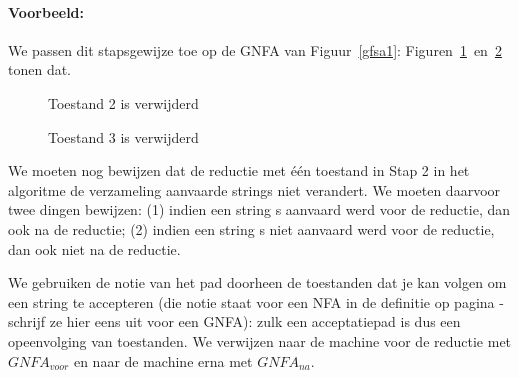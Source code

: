 \paragraph{Voorbeeld:} We passen dit stapsgewijze toe op de GNFA van
Figuur~\ref{gfsa1}: Figuren~\ref{gfsa2}~en~\ref{gfsa3} tonen dat.


\begin{figure}[h]
\caption{Toestand 2 is verwijderd \label{gfsa2}}
\end{figure}

\begin{figure}[h]
\caption{Toestand 3 is verwijderd\label{gfsa3}}
\end{figure}


We moeten nog bewijzen dat de reductie met \'{e}\'{e}n toestand in
Stap 2 in het algoritme de verzameling aanvaarde strings niet
verandert. We moeten daarvoor twee dingen bewijzen: (1) indien een
string s aanvaard werd voor de reductie, dan ook na de reductie; (2)
indien een string s niet aanvaard werd voor de reductie, dan ook niet
na de reductie.

\newpage
We gebruiken de notie van het pad doorheen de toestanden dat je kan
volgen om een string te accepteren (die notie staat voor een NFA in de
definitie op pagina \pageref{defacceptnfa} - schrijf ze hier eens uit
voor een GNFA): zulk een acceptatiepad is dus een opeenvolging van
toestanden. We verwijzen naar de machine voor de reductie met
$GNFA_{voor}$ en naar de machine erna met $GNFA_{na}$.

